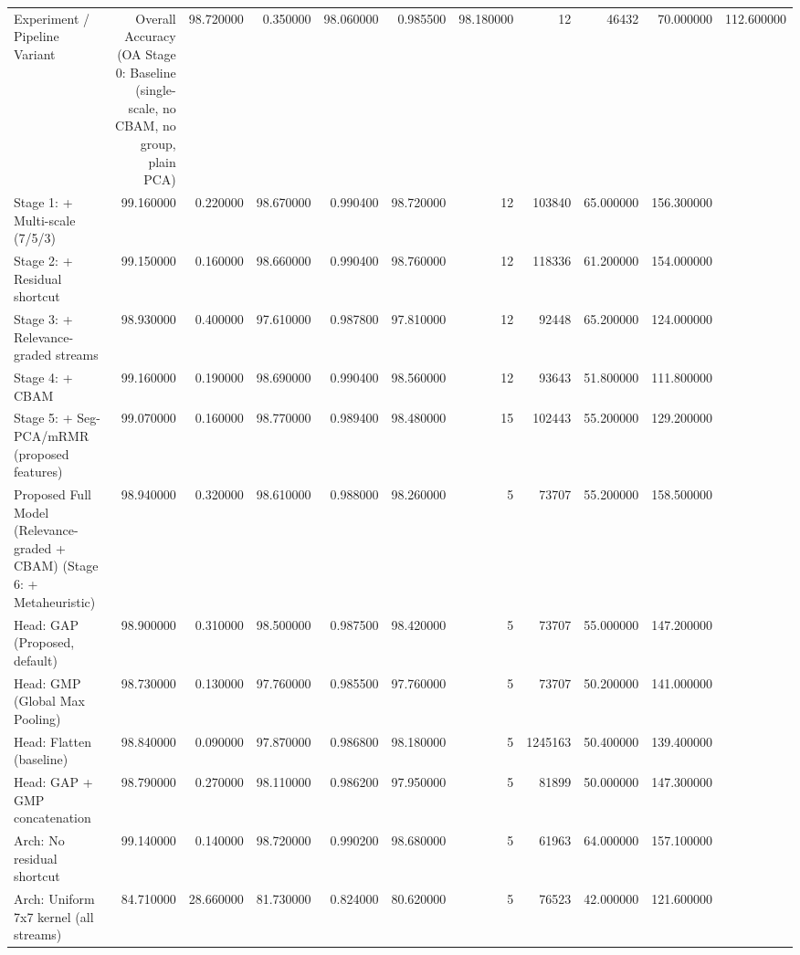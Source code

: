\begin{tabular}{lrrrrrrrrr}
\toprule
Experiment / Pipeline Variant & Overall Accuracy (OA %
\midrule
Stage 0: Baseline (single-scale, no CBAM, no group, plain PCA) & 98.720000 & 0.350000 & 98.060000 & 0.985500 & 98.180000 & 12 & 46432 & 70.000000 & 112.600000 \\
Stage 1: + Multi-scale (7/5/3) & 99.160000 & 0.220000 & 98.670000 & 0.990400 & 98.720000 & 12 & 103840 & 65.000000 & 156.300000 \\
Stage 2: + Residual shortcut & 99.150000 & 0.160000 & 98.660000 & 0.990400 & 98.760000 & 12 & 118336 & 61.200000 & 154.000000 \\
Stage 3: + Relevance-graded streams & 98.930000 & 0.400000 & 97.610000 & 0.987800 & 97.810000 & 12 & 92448 & 65.200000 & 124.000000 \\
Stage 4: + CBAM & 99.160000 & 0.190000 & 98.690000 & 0.990400 & 98.560000 & 12 & 93643 & 51.800000 & 111.800000 \\
Stage 5: + Seg-PCA/mRMR (proposed features) & 99.070000 & 0.160000 & 98.770000 & 0.989400 & 98.480000 & 15 & 102443 & 55.200000 & 129.200000 \\
Proposed Full Model (Relevance-graded + CBAM) (Stage 6: + Metaheuristic) & 98.940000 & 0.320000 & 98.610000 & 0.988000 & 98.260000 & 5 & 73707 & 55.200000 & 158.500000 \\
Head: GAP (Proposed, default) & 98.900000 & 0.310000 & 98.500000 & 0.987500 & 98.420000 & 5 & 73707 & 55.000000 & 147.200000 \\
Head: GMP (Global Max Pooling) & 98.730000 & 0.130000 & 97.760000 & 0.985500 & 97.760000 & 5 & 73707 & 50.200000 & 141.000000 \\
Head: Flatten (baseline) & 98.840000 & 0.090000 & 97.870000 & 0.986800 & 98.180000 & 5 & 1245163 & 50.400000 & 139.400000 \\
Head: GAP + GMP concatenation & 98.790000 & 0.270000 & 98.110000 & 0.986200 & 97.950000 & 5 & 81899 & 50.000000 & 147.300000 \\
Arch: No residual shortcut & 99.140000 & 0.140000 & 98.720000 & 0.990200 & 98.680000 & 5 & 61963 & 64.000000 & 157.100000 \\
Arch: Uniform 7x7 kernel (all streams) & 84.710000 & 28.660000 & 81.730000 & 0.824000 & 80.620000 & 5 & 76523 & 42.000000 & 121.600000 \\

\end{tabular}
